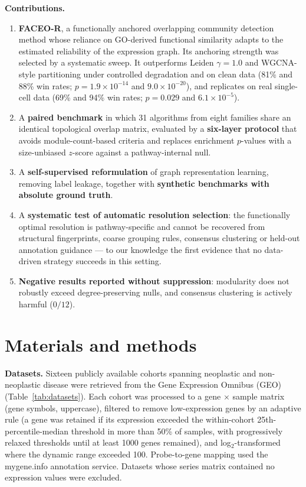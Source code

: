 \documentclass[twocolumn,10pt,letterpaper]{article}
\begin{document}
\noindent\textbf{Contributions.} \begin{enumerate}
\item \textbf{FACEO-R}, a functionally anchored overlapping community detection method whose
reliance on GO-derived functional similarity adapts to the estimated reliability of the
expression graph. Its anchoring strength was selected by a systematic sweep. It outperforms
Leiden $\gamma=1.0$ and WGCNA-style partitioning
under controlled degradation and on clean data (81\% and 88\% win rates; $p = 1.9\times10^{-14}$ and
$9.0\times10^{-20}$), and replicates on real single-cell data (69\% and 94\% win rates;
$p = 0.029$ and $6.1\times10^{-5}$).
\item A \textbf{paired benchmark} in which 31 algorithms from eight families share an
identical topological overlap matrix, evaluated by a \textbf{six-layer protocol} that avoids
module-count-based criteria and replaces enrichment $p$-values with a size-unbiased $z$-score
against a pathway-internal null.
\item A \textbf{self-supervised reformulation} of graph representation learning, removing
label leakage, together with \textbf{synthetic benchmarks with absolute ground truth}.
\item A \textbf{systematic test of automatic resolution selection}: the functionally optimal
resolution is pathway-specific and cannot be recovered from structural fingerprints, coarse
grouping rules, consensus clustering or held-out annotation guidance --- to our knowledge the
first evidence that no data-driven strategy succeeds in this setting.
\item \textbf{Negative results reported without suppression}: modularity does not robustly
exceed degree-preserving nulls, and consensus clustering is actively harmful ($0/12$).
\end{enumerate}

\section{Materials and methods}

\noindent\textbf{Datasets.} Sixteen publicly available cohorts spanning neoplastic and non-neoplastic disease were
retrieved from the Gene Expression Omnibus (GEO) (Table~\ref{tab:datasets}). Each cohort
was processed to a gene $\times$ sample matrix (gene symbols, uppercase), filtered to
remove low-expression genes by an adaptive rule (a gene was retained if its expression
exceeded the within-cohort 25th-percentile-median threshold in more than 50\% of samples,
with progressively relaxed thresholds until at least 1000 genes remained), and
log$_2$-transformed where the dynamic range exceeded 100. Probe-to-gene mapping used the
mygene.info annotation service. Datasets whose series matrix contained no expression
values were excluded.
\end{document}
